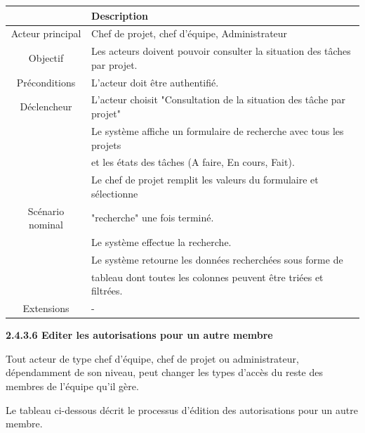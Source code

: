 \begin{center}
\begin{tabular}{|c|l|}
\hline 
&\textbf { Description }\\\hline 
    Acteur principal & Chef de projet, chef d’équipe, Administrateur \\\hline 
    Objectif&Les acteurs doivent pouvoir consulter la situation des tâches par projet.\\\hline
    Préconditions&L’acteur doit être authentifié.  \\\hline 
    Déclencheur&L’acteur choisit "Consultation de la situation des tâche par projet"\\\hline 
    &Le système affiche un formulaire de recherche avec tous les projets     \\
    &et les états des tâches (A faire, En cours, Fait).   \\
    &Le chef de projet remplit les valeurs du formulaire et sélectionne  \\
    Scénario nominal&"recherche" une fois terminé.    \\
    & Le système effectue la recherche.   \\
    &Le système retourne les données recherchées sous forme de   \\
    &tableau dont toutes les colonnes peuvent être triées et filtrées.\\\hline
    Extensions&                    - \\\hline
\end{tabular}
\label{desc_tache_proj}
\end{center}
\newpage
\par \textbf{  	 	 	2.4.3.6	Editer les autorisations pour un autre membre	}
\par Tout acteur de type chef d’équipe, chef de projet ou administrateur, dépendamment de son niveau, peut changer les types d'accès du reste des membres de l'équipe qu'il gère.
\par Le tableau ci-dessous décrit le processus d'édition des autorisations pour un autre membre.
